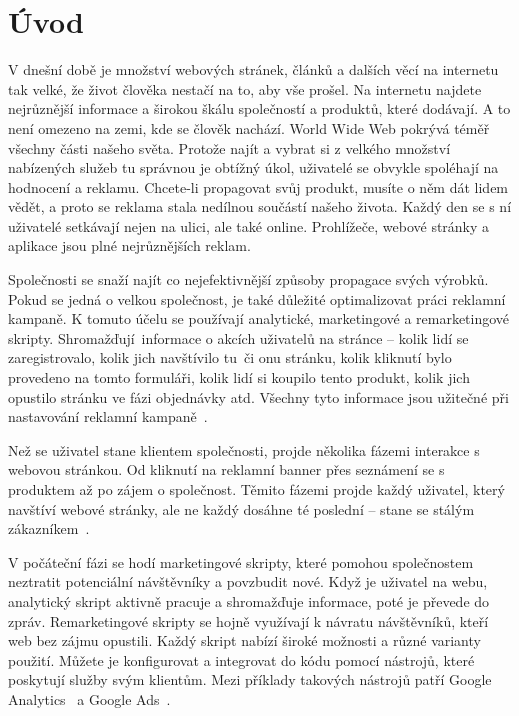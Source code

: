 
\chapter{Úvod}
\label{ch:1}
V dnešní době je množství webových stránek, článků a dalších věcí na internetu tak velké, že život člověka nestačí na to, aby vše prošel. Na internetu najdete nejrůznější informace a širokou škálu společností a produktů, které dodávají. A to není omezeno na zemi, kde se člověk nachází. World Wide Web pokrývá téměř všechny části našeho světa. Protože najít a vybrat si z velkého množství nabízených služeb tu správnou je obtížný úkol, uživatelé se obvykle spoléhají na hodnocení a reklamu. Chcete-li propagovat svůj produkt, musíte o něm dát lidem vědět, a proto se reklama stala nedílnou součástí našeho života. Každý den se s ní uživatelé setkávají nejen na ulici, ale také online. Prohlížeče, webové stránky a aplikace jsou plné nejrůznějších reklam.

Společnosti se snaží najít co nejefektivnější způsoby propagace svých výrobků. Pokud se jedná o velkou společnost, je také důležité optimalizovat práci reklamní kampaně. K tomuto účelu se používají analytické, marketingové a remarketingové skripty. Shromažďují~informace o akcích uživatelů na stránce -- kolik lidí se zaregistrovalo, kolik jich navštívilo tu~či onu stránku, kolik kliknutí bylo provedeno na tomto formuláři, kolik lidí si koupilo tento produkt, kolik jich opustilo stránku ve fázi objednávky atd. Všechny tyto informace jsou užitečné při nastavování reklamní kampaně~\cite{analitic}.

Než se uživatel stane klientem společnosti, projde několika fázemi interakce s webovou stránkou. Od kliknutí na reklamní banner přes seznámení se s produktem až po zájem o společnost. Těmito fázemi projde každý uživatel, který navštíví webové stránky, ale ne každý dosáhne té poslední -- stane se stálým zákazníkem~\cite{funnel}.

V počáteční fázi se hodí marketingové skripty, které pomohou společnostem neztratit potenciální návštěvníky a povzbudit nové. Když je uživatel na webu, analytický skript aktivně pracuje a shromažďuje informace, poté je převede do zpráv. Remarketingové skripty se hojně využívají k návratu návštěvníků, kteří web bez zájmu opustili. Každý skript nabízí široké možnosti a různé varianty použití. Můžete je konfigurovat a integrovat do kódu pomocí nástrojů, které poskytují služby svým klientům. Mezi příklady takových nástrojů patří Google Analytics~\cite{accountA} a Google Ads~\cite{accountM}.

